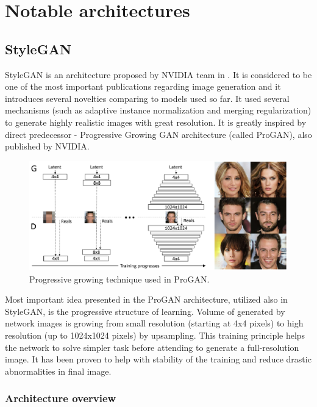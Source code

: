 \documentclass[12pt,a4paper,openany]{book}
\begin{document}
\chapter{Notable architectures}
\section{StyleGAN}

StyleGAN is an architecture proposed by NVIDIA team in \cite{stylegan}. It is considered to be one of the most important publications regarding image generation and it introduces several novelties comparing to models used so far. It used several mechanisms (such as adaptive instance normalization and merging regularization) to generate highly realistic images with great resolution. It is greatly inspired by direct predecessor - Progressive Growing GAN architecture (called ProGAN), also published by NVIDIA.

\begin{figure}[ht!]
    \centering
    \includegraphics[scale=1.0]{figs/progan-scheme.eps}
    \caption{Progressive growing technique used in ProGAN.}\label{Fig:PROGAN}
\end{figure}

Most important idea presented in the ProGAN architecture, utilized also in StyleGAN, is the progressive structure of learning. Volume of generated by network images is growing from small resolution (starting at 4x4 pixels) to high resolution (up to 1024x1024 pixels) by upsampling. This training principle helps the network to solve simpler task before attending to generate a full-resolution image. It has been proven to help with stability of the training and reduce drastic abnormalities in final image.

\subsection{Architecture overview}
\end{document}
